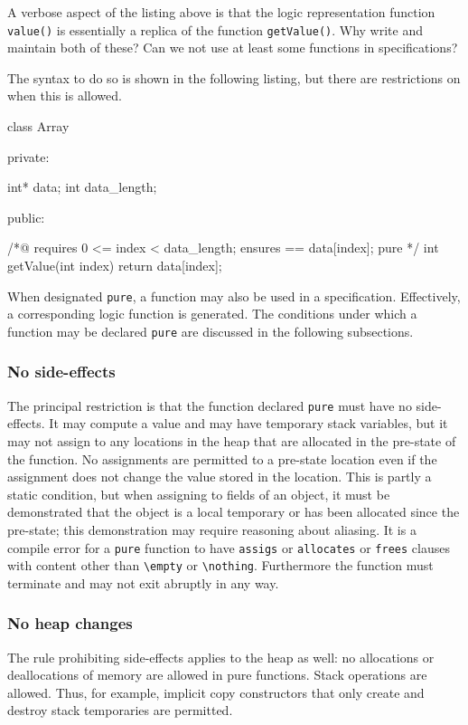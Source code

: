 \experimental

A verbose aspect of the listing above is that the logic representation function \lstinline|value()| is essentially a replica of
the \lang function \lstinline|getValue()|. Why write and maintain both of these? Can we not use at least some \lang functions in 
specifications?

The syntax to do so is shown in the following listing, but there are restrictions on when this is allowed.

\begin{listing-nonumber}
class Array {
	
  private:
	
    int* data;
    int data_length;
	
  public:
	
    /*@ 
      requires 0 <= index < data_length;
      ensures \result == data[index];
      pure
    */
    int getValue(int index) {
		return data[index];
    }	
}
\end{listing-nonumber}

When designated \lstinline|pure|, a \lang function may also be used in a \NAME specification. Effectively, a corresponding logic function is generated. 
The conditions under which a 
\lang function may be declared \lstinline|pure| are discussed in the following subsections.

\subsubsection{No side-effects}
The principal restriction is that the function declared \lstinline|pure| must have no side-effects. It may compute a value and may have 
temporary stack variables, but it may not assign to any locations in the heap that are allocated in the pre-state of the function.
No assignments are permitted to a pre-state location even if the assignment does not change the value stored in the location.
This is partly a static condition, but when assigning to fields of an object, it must be demonstrated that the object is a local temporary or
has been allocated since the pre-state; this demonstration may require reasoning about aliasing. It is a compile error for a \lstinline|pure|
function to have \lstinline|assigs| or \lstinline|allocates| or \lstinline|frees| clauses with content other than \lstinline|\empty| or \lstinline|\nothing|.
Furthermore the function must terminate and may not exit abruptly in any way.

\subsubsection{No heap changes}
The rule prohibiting side-effects applies to the heap as well:
no allocations or deallocations of memory are allowed in pure functions.
Stack operations are allowed. Thus, for example,
 implicit copy constructors that 
only create and destroy stack temporaries are permitted.

